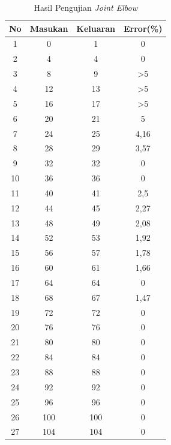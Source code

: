 \begin{longtable}{|c|c|c|c|}
	\caption{Hasil Pengujian \textit{Joint Elbow}}
	\label{tbl.elbow}\\
	\hline
	\rowcolor[HTML]{656565} 
	No & Masukan & Keluaran & Error(\%)       \\ \hline
	\endfirsthead
	\endhead
	1  & 0       & 1        & 0           \\ \hline
	2  & 4       & 4        & 0           \\ \hline
	3  & 8       & 9        & >5      \\ \hline
	4  & 12      & 13       & >5  \\ \hline
	5  & 16      & 17       & >5         \\ \hline
	6  & 20      & 21       & 5           \\ \hline
	7  & 24      & 25       & 4,16 \\ \hline
	8  & 28      & 29       & 3,57 \\ \hline
	9  & 32      & 32       & 0           \\ \hline
	10 & 36      & 36       & 0           \\ \hline
	11 & 40      & 41       & 2,5         \\ \hline
	12 & 44      & 45       & 2,27 \\ \hline
	13 & 48      & 49       & 2,08 \\ \hline
	14 & 52      & 53       & 1,92 \\ \hline
	15 & 56      & 57       & 1,78 \\ \hline
	16 & 60      & 61       & 1,66 \\ \hline
	17 & 64      & 64       & 0           \\ \hline
	18 & 68      & 67       & 1,47 \\ \hline
	19 & 72      & 72       & 0           \\ \hline
	20 & 76      & 76       & 0           \\ \hline
	21 & 80      & 80       & 0           \\ \hline
	22 & 84      & 84       & 0           \\ \hline
	23 & 88      & 88       & 0           \\ \hline
	24 & 92      & 92       & 0           \\ \hline
	25 & 96      & 96       & 0           \\ \hline
	26 & 100     & 100      & 0           \\ \hline
	27 & 104     & 104      & 0           \\ \hline

\end{longtable}
